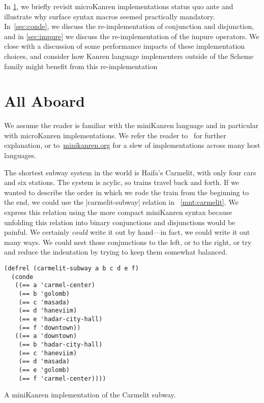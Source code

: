 \documentclass[sigplan,screen,draft,anonymous,review,natbib=false]{acmart}
\begin{document}
In \cref{sec:all-aboard}, we briefly revisit microKanren implementations
status quo ante and illustrate why surface syntax macros seemed
practically mandatory. In~\cref{sec:conde}, we discuss the
re-implementation of conjunction and disjunction, and in
\cref{sec:impure} we discuss the re-implementation of the impure
operators. We close with a discussion of some performance impacts of
these implementation choices, and consider how Kanren language
implementers outside of the Scheme family might benefit from this
re-implementation

\section{All Aboard}\label{sec:all-aboard}

We assume the reader is familiar with the miniKanren language and in
particular with microKanren implementations. We refer the reader
to~\cite{friedman2018reasoned,hemann2013muKanren,hemann2016small} for
further explanation, or to~\href{minikanren.org}{minikanren.org} for a
slew of implementations across many host languages.

The shortest subway system in the world is Haifa's Carmelit, with only
four cars and six stations. The system is acylic, so trains travel
back and forth. If we wanted to describe the order in which we rode
the train from the beginning to the end, we could use the
\rackinline|carmelit-subway| relation in ~\cref{mnt:carmelit}. We
express this relation using the more compact miniKanren syntax because
unfolding this relation into binary conjunctions and disjunctions
would be painful. We certainly \emph{could} write it out by hand---in
fact, we could write it out many ways. We could nest those
conjunctions to the left, or to the right, or try and reduce the
indentation by trying to keep them somewhat balanced.

\begin{listing}
  \begin{verbatim}
(defrel (carmelit-subway a b c d e f)
  (conde
   ((== a 'carmel-center)
    (== b 'golomb)
    (== c 'masada)
    (== d 'haneviim)
    (== e 'hadar-city-hall)
    (== f 'downtown))
   ((== a 'downtown)
    (== b 'hadar-city-hall)
    (== c 'haneviim)
    (== d 'masada)
    (== e 'golomb)
    (== f 'carmel-center))))
  \end{verbatim}
  \caption{A miniKanren implementation of the Carmelit subway.}
  \label{mnt:carmelit}
\end{listing}
\end{document}
